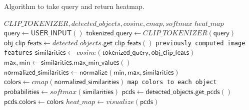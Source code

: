 \begin{Algorithmus} %
  \caption{Algorithm to take query and return heatmap.}
  \label{alg:queryHandler}
  \begin{algorithmic}
    \Require $CLIP\_TOKENIZER, detected\_objects, cosine, cmap, softmax$
    \Ensure $heat\_map$
    \State $\mathsf{query} \gets \mathsf{USER\_INPUT}() $ 
    \State $\mathsf{tokenized\_query} \gets CLIP\_TOKENIZER(\mathsf{query}) $ 
    \State $\mathsf{obj\_clip\_feats} \gets detected\_objects\mathsf{.get\_clip\_feats()}$  \Comment \texttt{previously computed image features}
    \State $\mathsf{similarities} \gets cosine(\mathsf{tokenized\_query, obj\_clip\_feats})$ 
    \State $\mathsf{max, min} \gets \mathsf{similarities.max\_min\_values()}$
    \State $\mathsf{normalized\_similarities} \gets \mathsf{normalize(min,max,similarities)}$
    \State $\mathsf{colors} \gets cmap\mathsf{(normalized\_similarities)}$  \Comment \texttt{map colors to each object}
    \State $\mathsf{probabilities} \gets softmax\mathsf{(similarities)}$
    \State $\mathsf{pcds} \gets \mathsf{detected\_objects.get\_pcds()}$
    \State $\mathsf{pcds.colors} \gets \mathsf{colors}$
    \State $heat\_map \gets visualize(\mathsf{pcds})$
  \end{algorithmic}
\end{Algorithmus}
